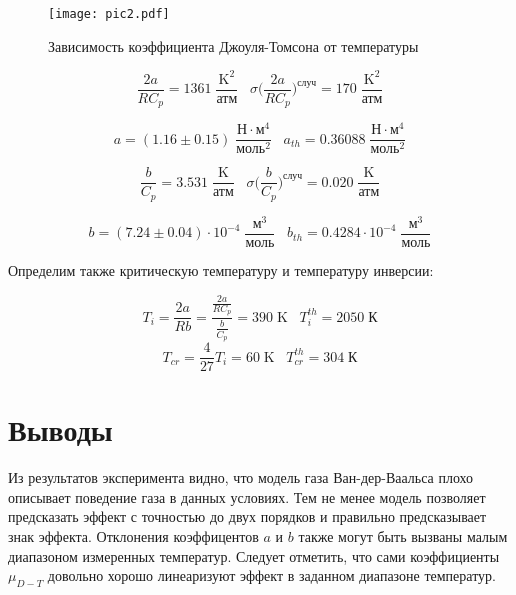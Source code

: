 \documentclass[a4paper, 12pt]{article}
\begin{document}
	\begin{figure}[H]
		\centering
		\texttt{[image: pic2.pdf]}
		\caption{Зависимость коэффициента Джоуля-Томсона от температуры}
	\end{figure}
	
	\begin{equation*}
		\frac{2a}{RC_p} = 1361 \; \frac{\text{K}^2}{\text{атм}} \;\;\; \sigma \Big(\frac{2a}{RC_p}\Big)^{\text{случ}} = 170 \; \frac{\text{K}^2}{\text{атм}} 
	\end{equation*}

	$$ a = (1.16 \pm 0.15) \; \frac{\text{Н}\cdot \text{м}^4}{\text{моль}^2} \;\;\; a_{th} = 0.36088 \; \frac{\text{Н}\cdot \text{м}^4}{\text{моль}^2} $$
	
	\begin{equation*}
		\frac{b}{C_p} = 3.531 \; \frac{\text{K}}{\text{атм}} \;\;\; \sigma \Big(\frac{b}{C_p}\Big)^{\text{случ}} = 0.020 \; \frac{\text{K}}{\text{атм}}
	\end{equation*}

	$$ b = (7.24 \pm 0.04) \cdot 10^{-4} \; \frac{\text{м}^3}{\text{моль}} \;\;\; b_{th} = 0.4284 \cdot 10^{-4} \; \frac{\text{м}^3}{\text{моль}} $$

	Определим также критическую температуру и температуру инверсии:
	
	$$ T_i = \frac{2a}{Rb} = \frac{\frac{2a}{RC_p}}{\frac{b}{C_p}} = 390 \; \text{K} \;\;\; T_i^{th} = 2050 \; \text{К}$$
	$$ T_{cr} = \frac{4}{27} T_i = 60 \; \text{K} \;\;\; T_{cr}^{th} = 304 \; \text{К}$$
	
\section*{Выводы}
	Из результатов эксперимента видно, что модель газа Ван-дер-Ваальса плохо описывает поведение газа в данных условиях. Тем не менее модель позволяет предсказать эффект с точностью до двух порядков и правильно предсказывает знак эффекта. Отклонения коэффицентов $a$ и $b$ также могут быть вызваны малым диапазоном измеренных температур. Следует отметить, что сами коэффициенты $\mu_{D-T}$ довольно хорошо линеаризуют эффект в заданном диапазоне температур.
	
\end{document}
